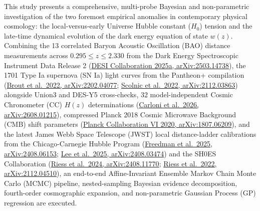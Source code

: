 \documentclass[11pt,letterpaper]{article}
\begin{document}
{\small
This study presents a comprehensive, multi-probe Bayesian and non-parametric investigation of the two foremost empirical anomalies in contemporary physical cosmology: the local-versus-early Universe Hubble constant ($H_0$) tension and the late-time dynamical evolution of the dark energy equation of state $w(z)$. Combining the 13 correlated Baryon Acoustic Oscillation (BAO) distance measurements across $0.295 \le z \le 2.330$ from the Dark Energy Spectroscopic Instrument Data Release 2 (\href{https://arxiv.org/abs/2503.14738}{DESI Collaboration 2025a, arXiv:2503.14738}), the 1701 Type Ia supernova (SN Ia) light curves from the Pantheon+ compilation (\href{https://arxiv.org/abs/2202.04077}{Brout et al.\ 2022, arXiv:2202.04077}; \href{https://arxiv.org/abs/2112.03863}{Scolnic et al.\ 2022, arXiv:2112.03863}) alongside Union3 and DES-Y5 cross-checks, 32 model-independent Cosmic Chronometer (CC) $H(z)$ determinations (\href{https://arxiv.org/pdf/2608.01215}{Carloni et al.\ 2026, arXiv:2608.01215}), compressed Planck 2018 Cosmic Microwave Background (CMB) shift parameters (\href{https://arxiv.org/abs/1807.06209}{Planck Collaboration VI 2020, arXiv:1807.06209}), and the latest James Webb Space Telescope (JWST) local distance-ladder calibrations from the Chicago-Carnegie Hubble Program (\href{https://arxiv.org/abs/2408.06153}{Freedman et al.\ 2025, arXiv:2408.06153}; \href{https://arxiv.org/abs/2408.03474}{Lee et al.\ 2025, arXiv:2408.03474}) and the SH0ES Collaboration (\href{https://arxiv.org/abs/2408.11770}{Riess et al.\ 2024, arXiv:2408.11770}; \href{https://arxiv.org/pdf/2112.04510}{Riess et al.\ 2022, arXiv:2112.04510}), an end-to-end Affine-Invariant Ensemble Markov Chain Monte Carlo (MCMC) pipeline, nested-sampling Bayesian evidence decomposition, fourth-order cosmographic expansion, and non-parametric Gaussian Process (GP) regression are executed.

}
\end{document}
